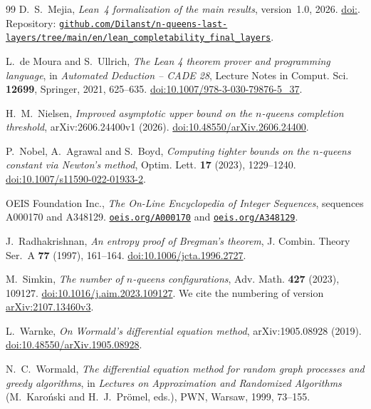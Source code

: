 \begin{thebibliography}{99}
\ifverificacionLean
{} D.~S.~Mejia, \emph{Lean~4 formalization of the main results}, version~1.0, 2026.
\ifx\DOIcodigoLean\empty\else\href{https://doi.org/\DOIcodigoLean}{doi:\DOIcodigoLean}. \fi
Repository:
\href{https://github.com/Dilanst/n-queens-last-layers/tree/main/en/lean_completability_final_layers}%
{\nolinkurl{github.com/Dilanst/n-queens-last-layers/tree/main/en/lean_completability_final_layers}}.
\fi

\ifverificacionLean
{} L.~de Moura and S.~Ullrich, \emph{The Lean 4 theorem prover and programming
language}, in \emph{Automated Deduction -- CADE 28}, Lecture Notes in Comput. Sci.
\textbf{12699}, Springer, 2021, 625--635.
\href{https://doi.org/10.1007/978-3-030-79876-5_37}{doi:10.1007/978-3-030-79876-5\_37}.
\fi

 H.~M.~Nielsen,
\emph{Improved asymptotic upper bound on the $n$-queens completion threshold}, arXiv:2606.24400v1 (2026).
\href{https://doi.org/10.48550/arXiv.2606.24400}{doi:10.48550/arXiv.2606.24400}.

 P.~Nobel, A.~Agrawal and S.~Boyd, \emph{Computing tighter bounds on the $n$-queens
constant via Newton's method}, Optim. Lett. \textbf{17} (2023), 1229--1240.
\href{https://doi.org/10.1007/s11590-022-01933-2}{doi:10.1007/s11590-022-01933-2}.

 OEIS Foundation Inc., \emph{The On-Line Encyclopedia of Integer Sequences}, sequences
A000170 and A348129. \href{https://oeis.org/A000170}{\nolinkurl{oeis.org/A000170}} and
\href{https://oeis.org/A348129}{\nolinkurl{oeis.org/A348129}}.

 J.~Radhakrishnan, \emph{An entropy proof of Bregman's theorem}, J. Combin.
Theory Ser.~A \textbf{77} (1997), 161--164.
\href{https://doi.org/10.1006/jcta.1996.2727}{doi:10.1006/jcta.1996.2727}.

 M.~Simkin, \emph{The number of $n$-queens configurations}, Adv. Math.
\textbf{427} (2023), 109127.
\href{https://doi.org/10.1016/j.aim.2023.109127}{doi:10.1016/j.aim.2023.109127}.
We cite the numbering of version
\href{https://arxiv.org/abs/2107.13460v3}{arXiv:2107.13460v3}.

 L.~Warnke, \emph{On Wormald's differential equation method}, arXiv:1905.08928 (2019).
\href{https://doi.org/10.48550/arXiv.1905.08928}{doi:10.48550/arXiv.1905.08928}.

 N.~C.~Wormald, \emph{The differential equation method for random graph processes and
greedy algorithms}, in \emph{Lectures on Approximation and Randomized Algorithms}
(M.~Karoński and H.~J.~Prömel, eds.), PWN, Warsaw, 1999, 73--155.

\end{thebibliography}
